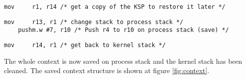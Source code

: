 \documentclass[11pt, oneside]{article}   	%
\begin{document}
\begin{lstlisting}[backgroundcolor=\color{red!15}]
    mov     r1, r14	/* get a copy of the KSP to restore it later */
\end{lstlisting}
\begin{lstlisting}[backgroundcolor=\color{yellow!15}]
    mov     r13, r1	/* change stack to process stack */	
    pushm.w #7, r10	/* Push r4 to r10 on process stack (save) */
\end{lstlisting}
\begin{lstlisting}[backgroundcolor=\color{red!15}]
    mov     r14, r1	/* get back to kernel stack */
\end{lstlisting}

The whole context is now saved on process stack and the kernel stack has been cleaned. The saved context structure is shown at figure \ref{fig:context}.
\end{document}
